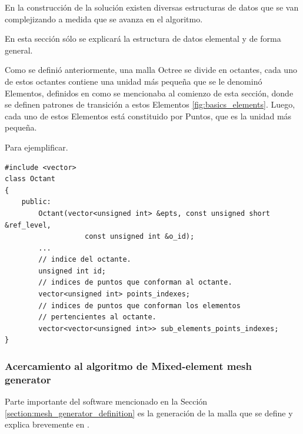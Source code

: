 En la construcción de la solución existen diversas estructuras de datos que se van complejizando a medida que se avanza en el algoritmo.

En esta sección sólo se explicará la estructura de datos elemental y de forma general. 

Como se definió anteriormente, una malla Octree se divide en octantes, cada uno de estos octantes contiene una unidad más pequeña que se le denominó Elementos, definidos en \cite{Gonzalez2014} como se mencionaba al comienzo de esta sección, donde se definen patrones de transición a estos Elementos \autoref{fig:basics_elements}.  Luego, cada uno de estos Elementos está constituido por Puntos, que es la unidad más pequeña.

Para ejemplificar.

\begin{lstlisting}[style=CStyle,caption={Clase Octant.\\ Fuente: Elaboración propia.},label={code:octant_class}]
#include <vector>
class Octant
{
	public:
        Octant(vector<unsigned int> &epts, const unsigned short &ref_level,
    			   const unsigned int &o_id);
        ...
        // indice del octante.
        unsigned int id;
        // indices de puntos que conforman al octante.
        vector<unsigned int> points_indexes;
        // indices de puntos que conforman los elementos 
        // pertencientes al octante.
        vector<vector<unsigned int>> sub_elements_points_indexes;
}
\end{lstlisting}



\subsubsection{Acercamiento al algoritmo de Mixed-element mesh generator}

Parte importante del software mencionado en la Sección \ref{section:mesh_generator_definition} es la generación de la malla que se define y explica brevemente en \cite{daines2018repairing}.


